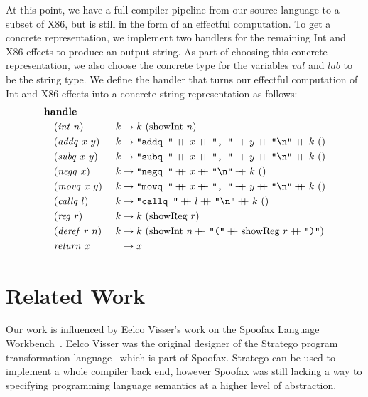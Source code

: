 \documentclass[a4paper,UKenglish,cleveref, autoref, thm-restate]{oasics-v2021}
\newcommand\append{+\!\!\!\!+~}
\begin{document}
At this point, we have a full compiler pipeline from our source language to a subset of X86, but is still in the form of an effectful computation.
To get a concrete representation, we implement two handlers for the remaining Int and X86 effects to produce an output string.
As part of choosing this concrete representation, we also choose the concrete type for the variables $\mathit{val}$ and $\mathit{lab}$ to be the string type.
We define the handler that turns our effectful computation of Int and X86 effects into a concrete string representation as follows:
\begin{alignat*}{2}
  & \mathbf{handle} && \\
  & \quad(\mathit{int}~n)~&& k \to k~(\mathrm{showInt}~n) \\
  & \quad(\mathit{addq}~x~y)~&& k \to \texttt{"addq "} \append x \append \texttt{", "} \append y \append \texttt{"\textbackslash{}n"} \append k~() \\
  & \quad(\mathit{subq}~x~y)~&& k \to \texttt{"subq "} \append x \append \texttt{", "} \append y \append \texttt{"\textbackslash{}n"} \append k~() \\
  & \quad(\mathit{negq}~x)~&& k \to \texttt{"negq "} \append x \append \texttt{"\textbackslash{}n"} \append k~() \\
  & \quad(\mathit{movq}~x~y)~&& k \to \texttt{"movq "} \append x \append \texttt{", "} \append y \append \texttt{"\textbackslash{}n"} \append k~() \\
  & \quad(\mathit{callq}~l)~&& k \to \texttt{"callq "} \append l \append \texttt{"\textbackslash{}n"} \append k~() \\
  & \quad(\mathit{reg}~r)~&& k \to k~(\mathrm{showReg}~r) \\
  & \quad(\mathit{deref}~r~n)~&& k \to k~(\mathrm{showInt}~n \append \texttt{"("} \append \mathrm{showReg}~r \append \texttt{")"}) \\
  & \quad\mathit{return}~x~&& \hspace{0.55em}\to x 
\end{alignat*}

\section{Related Work}\label{sec:related}

Our work is influenced by Eelco Visser's work on the Spoofax Language Workbench~\cite{10.1145/1869459.1869497}. 
Eelco Visser was the original designer of the Stratego program transformation language~\cite{10.1007/3-540-45127-7_27} which is part of Spoofax. 
Stratego can be used to implement a whole compiler back end, however Spoofax was still lacking a way to specifying programming language semantics at a higher level of abstraction.
\end{document}
